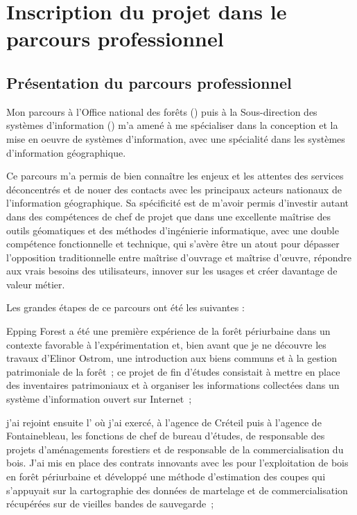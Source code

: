 \section[origin]
{Inscription du projet dans le parcours professionnel}

\subsection
{Présentation du parcours professionnel}

Mon parcours à l'Office national des forêts ({\ONF})
puis à la Sous-direction des systèmes d'information ({\SDSI})
m'a amené à me spécialiser dans la conception et la mise en oeuvre
de systèmes d'information, avec une spécialité dans les systèmes d'information géographique.

Ce parcours m'a permis de bien connaître les enjeux et les attentes
des services déconcentrés et de nouer des contacts avec les principaux
acteurs nationaux de l'information géographique.
Sa spécificité est de m'avoir permis d'investir autant dans
des compétences de chef de projet que dans une excellente maîtrise
des outils géomatiques et des méthodes d'ingénierie informatique,
avec une double compétence fonctionnelle et technique,
qui s'avère être un atout pour dépasser l'opposition traditionnelle
entre maîtrise d'ouvrage et maîtrise d’œuvre,
répondre aux vrais besoins des utilisateurs, innover sur les usages
et créer davantage de valeur métier.

Les grandes étapes de ce parcours ont été les suivantes :

\startitemize[n]

\item Epping Forest
      a été une première expérience de la forêt
      périurbaine dans un contexte favorable à l'expérimentation
      et, bien avant que je ne découvre les travaux d'Elinor Ostrom,
      une introduction aux biens communs et à la gestion patrimoniale de la forêt~;
      ce projet de fin d'études consistait à mettre en place des inventaires patrimoniaux
      et à organiser les informations collectées dans un système d'information
      ouvert sur Internet~;

\item j'ai rejoint ensuite l'{\ONF}
      où j'ai exercé, à l'agence de Créteil puis à l'agence de Fontainebleau,
      les fonctions de chef de bureau d'études, de responsable
      des projets d'aménagements forestiers et de responsable
      de la commercialisation du bois. J'ai mis en place
      des contrats innovants avec les {\ETF} pour l'exploitation de bois
      en forêt périurbaine et développé une méthode d'estimation
      des coupes qui s'appuyait sur la cartographie
      des données de martelage et de commercialisation
      récupérées sur de vieilles bandes de sauvegarde~;


